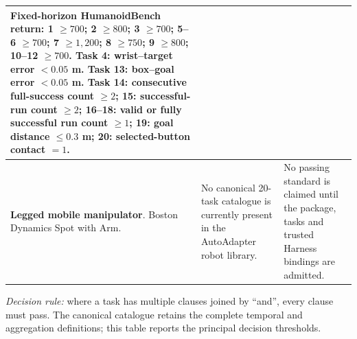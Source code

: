 \begin{landscape}
\begin{longtable}{@{}>{\raggedright\arraybackslash}p{47mm}>{\raggedright\arraybackslash}p{85mm}>{\raggedright\arraybackslash}p{84mm}@{}}
Fixed-horizon HumanoidBench return: 1 $\geq 700$; 2 $\geq 800$; 3 $\geq 700$; 5--6 $\geq 700$; 7 $\geq 1{,}200$; 8 $\geq 750$; 9 $\geq 800$; 10--12 $\geq 700$. Task 4: wrist--target error $< 0.05$ m. Task 13: box--goal error $< 0.05$ m. Task 14: consecutive full-success count $\geq 2$; 15: successful-run count $\geq 2$; 16--18: valid or fully successful run count $\geq 1$; 19: goal distance $\leq 0.3$ m; 20: selected-button contact $= 1$. \\
\midrule
\textbf{Legged mobile manipulator}. Boston Dynamics Spot with Arm. &
No canonical 20-task catalogue is currently present in the AutoAdapter robot library. &
No passing standard is claimed until the package, tasks and trusted Harness bindings are admitted. \\
\end{longtable}

\noindent\emph{Decision rule:} where a task has multiple clauses joined by ``and'', every clause must pass. The canonical catalogue retains the complete temporal and aggregation definitions; this table reports the principal decision thresholds.
\endgroup
\end{landscape}

